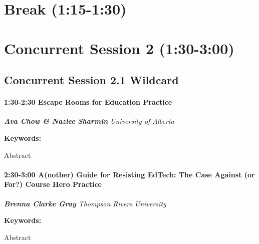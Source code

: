 \documentclass[
]{book}
\begin{document}
\hypertarget{break-115-130}{%
\section*{Break (1:15-1:30)}\label{break-115-130}}

\hypertarget{concurrent-session-2-130-300}{%
\section*{Concurrent Session 2 (1:30-3:00)}\label{concurrent-session-2-130-300}}

\hypertarget{concurrent-session-2.1-wildcard}{%
\subsection*{Concurrent Session 2.1 \textbar{} Wildcard}\label{concurrent-session-2.1-wildcard}}

\begin{session}
\hypertarget{escape-rooms-for-education-practice}{%
\paragraph*{\texorpdfstring{1:30-2:30 \textbar{} \textbf{Escape Rooms
for Education} \textbar{}
Practice}{1:30-2:30 \textbar{} Escape Rooms for Education \textbar{} Practice}}\label{escape-rooms-for-education-practice}}

\textbf{\emph{Ava Chow \& Nazlee Sharmin}} \textbar{} \emph{University
of Alberta}

\textbf{Keywords:}

Abstract
\end{session}

\begin{session}
\hypertarget{another-guide-for-resisting-edtech-the-case-against-or-for-course-hero-practice}{%
\paragraph*{\texorpdfstring{2:30-3:00 \textbar{} \textbf{A(nother) Guide
for Resisting EdTech: The Case Against (or For?) Course Hero} \textbar{}
Practice}{2:30-3:00 \textbar{} A(nother) Guide for Resisting EdTech: The Case Against (or For?) Course Hero \textbar{} Practice}}\label{another-guide-for-resisting-edtech-the-case-against-or-for-course-hero-practice}}

\textbf{\emph{Brenna Clarke Gray}} \textbar{} \emph{Thompson Rivers
University}

\textbf{Keywords:}

Abstract
\end{session}
\end{document}
